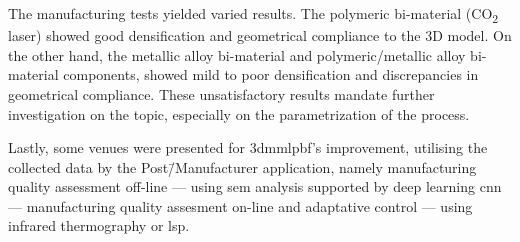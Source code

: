 The manufacturing tests yielded varied results. The polymeric bi-material
(CO\textsubscript{2} laser) showed good densification and geometrical
compliance to the 3D model. On the other hand, the metallic alloy bi-material and
polymeric/metallic alloy bi-material components, showed mild to poor
densification and discrepancies in geometrical compliance. These unsatisfactory
results mandate further investigation on the topic, especially on the
parametrization of the process.

Lastly, some venues were presented for \gls{3dmmlpbf}'s improvement, utilising
the collected data by the Post\=/Manufacturer application, namely
manufacturing quality assessment off-line --- using \gls{sem} analysis supported by
deep learning \gls{cnn} --- manufacturing quality assesment on-line and
adaptative control --- using infrared thermography or
\gls{lsp}.


